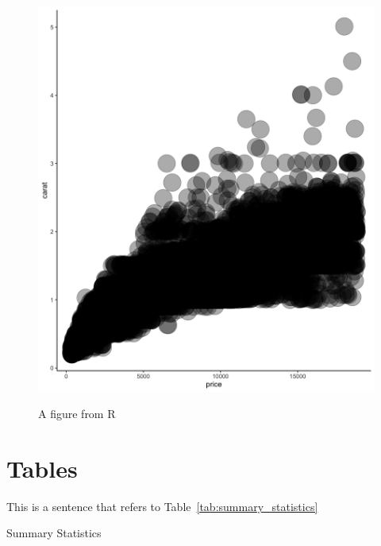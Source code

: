 \documentclass[12pt]{article}%
\begin{document}
\begin{figure}[h]
	\caption[R-figure]{A figure from R}
	  \centering
	  \includegraphics[width=\linewidth]{../output/r_figure.png}
	\label{fig:r_figure}
\end{figure}


 \FloatBarrier
\section{Tables}

\FloatBarrier

This is a sentence that refers to Table~\ref{tab:summary_statistics}
\newpage
	\begin{table}[h!]\centering
			\begin{adjustbox}{width=.8\textwidth}
			\centering
			  \begin{threeparttable}
			    \caption{Summary Statistics}
			    \label{tab:summary_statistics}
			  \end{threeparttable}
			 \end{adjustbox}
		\end{table}
\end{document}
